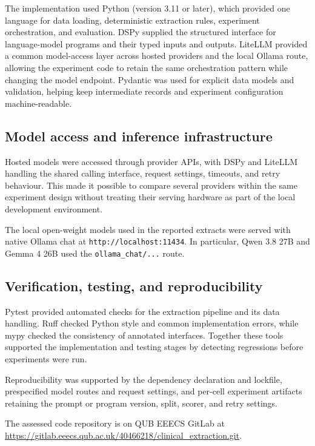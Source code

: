 \documentclass[conference]{IEEEtran}
\begin{document}
The implementation used Python (version 3.11 or later), which provided one
language for data loading, deterministic extraction rules, experiment
orchestration, and evaluation. DSPy supplied the structured interface for
language-model programs and their typed inputs and outputs. LiteLLM provided
a common model-access layer across hosted providers and the local Ollama
route, allowing the experiment code to retain the same orchestration pattern
while changing the model endpoint. Pydantic was used for explicit data
models and validation, helping keep intermediate records and experiment
configuration machine-readable. 

\subsection{Model access and inference infrastructure}

Hosted models were accessed through provider APIs, with DSPy and LiteLLM
handling the shared calling interface, request settings, timeouts, and retry
behaviour. This made it possible to compare several providers within the
same experiment design without treating their serving hardware as part of
the local development environment. 

The local open-weight models used in the reported extracts were served with
native Ollama chat at \texttt{http://localhost:11434}. In particular, Qwen
3.8 27B and Gemma 4 26B used the \texttt{ollama\_chat/...} route. 

\subsection{Verification, testing, and reproducibility}

Pytest provided automated checks for the extraction pipeline and its data
handling. Ruff checked Python style and common implementation errors, while
mypy checked the consistency of annotated interfaces. Together these tools
supported the implementation and testing stages by detecting regressions
before experiments were run. 

Reproducibility was supported by the dependency declaration and lockfile,
prespecified model routes and request settings, and per-cell experiment
artifacts retaining the prompt or program version, split, scorer, and retry
settings. 

The assessed code repository is on QUB EEECS
GitLab at \url{https://gitlab.eeecs.qub.ac.uk/40466218/clinical_extraction.git}.
\end{document}
